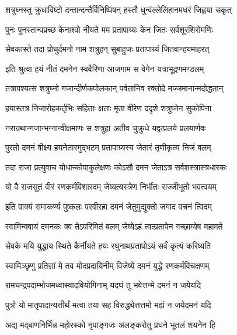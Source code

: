 

\twolineshloka
{शत्रुघ्नस्तु क्रुधाविष्टो दन्तान्दन्तैर्विनिष्पिषन्}
{हस्तौ धुन्वंल्लेलिहानमधरं जिह्वया सकृत्}%

\twolineshloka
{पुनः पुनस्तान्पप्रच्छ केनाश्वो नीयते मम}
{प्रतापाग्र्यः केन जितः सर्वशूरशिरोमणिः}%

\twolineshloka
{सेवकास्ते तदा प्रोचुर्दमनो नाम शत्रुहन्}
{सुबाहुजः प्रतापाग्र्यं जितवान्हयमाहरत्}%

\twolineshloka
{इति श्रुत्वा हयं नीतं दमनेन स्ववैरिणा}
{आजगाम स वेगेन यत्राभूद्रणमण्डलम्}%

\twolineshloka
{तत्रापश्यत्स शत्रुघ्नो गजान्दीर्णकपोलकान्}
{पर्वतानिव रक्तोदे मज्जमानान्मदोद्धतान्}%

\twolineshloka
{हयास्तत्र निजारोहकर्तृभिः सहिताः क्षताः}
{मृता वीरेण ददृशे शत्रुघ्नेन सुकोपिना}%

\twolineshloka
{नरान्रथान्गजान्भग्नान्वीक्षमाणः स शत्रुहा}
{अतीव चुक्रुधे यद्वत्प्रलये प्रलयार्णवः}%

\twolineshloka
{पुरतो दमनं वीक्ष्य हयनेतारमुद्भटम्}
{प्रतापाग्र्यस्य जेतारं तृणीकृत्य निजं बलम्}%

\twolineshloka
{तदा राजा प्रत्युवाच योधान्कोपाकुलेक्षणः}
{कोऽसौ दमन जेताऽत्र सर्वशस्त्रास्त्रधारकः}%

\twolineshloka
{यो वै राजसुतं वीरं रणकर्मविशारदम्}
{जेष्यत्यस्त्रेण निर्भीतः सज्जीभूतो भवत्वयम्}%

\twolineshloka
{इति वाक्यं समाकर्ण्य पुष्कलः परवीरहा}
{दमनं जेतुमुद्युक्तो जगाद वचनं त्विदम्}%

\twolineshloka
{स्वामिन्क्वायं दमनकः क्व तेऽपरिमितं बलम्}
{जेष्येऽहं त्वत्प्रतापेन गच्छाम्येष महामते}%

\twolineshloka
{सेवके मयि युद्धाय स्थिते कैर्नीयते हयः}
{रघुनाथप्रतापोऽयं सर्वं कृत्यं करिष्यति}%

\twolineshloka
{स्वामिञ्छृणु प्रतिज्ञां मे तव मोदप्रदायिनीम्}
{विजेष्ये दमनं युद्धे रणकर्मविचक्षणम्}%

\twolineshloka
{रामचन्द्रपदाम्भोजमध्वास्वादवियोगिनाम्}
{यदघं तु भवेत्तन्मे दमनं न जयेयदि}%

\twolineshloka
{पुत्रो यो मातृपादान्यत्तीर्थं मत्वा तया सह}
{विरुद्ध्येत्तत्तमो मह्यं न जयेदमनं यदि}%

\twolineshloka
{अद्य मद्बाणनिर्भिन्न महोरस्को नृपाङ्गजः}
{अलङ्करोतु प्रधने भूतलं शयनेन हि}%


